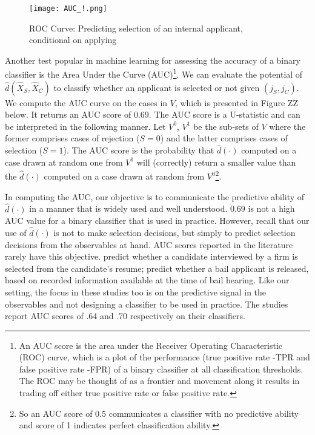 \documentclass{article}
\begin{document}
\begin{figure}[!ht]
    \centering
    \texttt{[image: AUC\_!.png]} %
    \caption{ROC Curve: Predicting selection of an internal applicant, conditional on applying} %
    \label{fig:AUC1} 
\end{figure}



Another test popular in machine learning for assessing the accuracy of a binary classifier is the Area Under the Curve (AUC)\footnote{An AUC score is the area under the Receiver Operating Characteristic (ROC) curve, which is a plot of the performance (true positive rate -TPR and false positive rate -FPR) of a binary classifier at all classification thresholds. The ROC may be thought of as a frontier and movement along it results in trading off either true positive rate or false positive rate.}. We can evaluate the potential of \(\hat{d}(\hat{X}_S, \hat{X}_C)\) to classify whether an applicant is selected or not given \((j_S, j_C)\). We compute the AUC curve on the cases in \(V\), which is presented in Figure ZZ below. It returns an AUC score of 0.69. The AUC score is a U-statistic and can be interpreted in the following manner. Let \(V^0\), \(V^1\) be the sub-sets of \(V\) where the former comprises cases of rejection (\(S = 0\)) and the latter comprises cases of selection (\(S = 1\)). The AUC score is the probability that \(\hat{d}(\cdot)\) computed on a case drawn at random one from \(V^1\) will (correctly) return a smaller value than the \(\hat{d}(\cdot)\) computed on a case drawn at random from \(V^0\)\footnote{So an AUC score of 0.5 communicates a classifier with no predictive ability and score of 1 indicates perfect classification ability.}.

In computing the AUC, our objective is to communicate the predictive ability of \(\hat{d}(\cdot)\) in a manner that is widely used and well understood. 0.69 is not a high AUC value for a binary classifier that is used in practice. However, recall that our use of \(\hat{d}(\cdot)\) is not to make selection decisions, but simply to predict selection decisions from the observables at hand. AUC scores reported in the literature rarely have this objective. \autocite{Li2022} predict whether a candidate interviewed by a firm is selected from the candidate’s resume; \autocite{Kleinberg2018} predict whether a bail applicant is released, based on recorded information available at the time of bail hearing. Like our setting, the focus in these studies too is on the predictive signal in the observables and not designing a classifier to be used in practice. The studies report AUC scores of .64 and .70 respectively on their classifiers.
\end{document}
